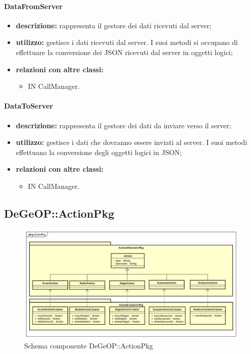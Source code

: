 \paragraph{DataFromServer}
\begin{itemize}
	\item \textbf{descrizione:} rappresenta il gestore dei dati ricevuti dal server;
	\item \textbf{utilizzo:} gestisce i dati ricevuti dal server. I suoi metodi si occupano di effettuare la conversione dei JSON ricevuti dal server in oggetti logici;
	\item \textbf{relazioni con altre classi:} 
	\begin{itemize}
		\item IN CallManager.
	\end{itemize}
\end{itemize}
\paragraph{DataToServer}
\begin{itemize}
	\item \textbf{descrizione:} rappresenta il gestore dei dati da inviare verso il server;
	\item \textbf{utilizzo:} gestisce i dati che dovranno essere inviati al server. I suoi metodi effettuano la conversione degli oggetti logici in JSON;
	\item \textbf{relazioni con altre classi:} 
	\begin{itemize}
		\item IN CallManager.
	\end{itemize}
\end{itemize}
\newpage
\subsection{DeGeOP::ActionPkg}
\label{pkg::ActionPkg}
\begin{figure}[H]
	\centering
	\includegraphics[width=\textwidth]{img/PkgDiagram/ActionPkg.png}
	\caption{Schema componente DeGeOP::ActionPkg}
\end{figure}
